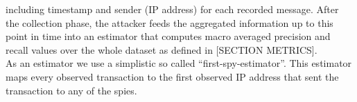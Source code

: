 including timestamp and sender (IP address) for each recorded message. After the collection phase,
the attacker feeds the aggregated information up to this point in time into an estimator that
computes macro averaged precision and recall values over the whole dataset as defined in
[SECTION METRICS]. \\
As an estimator we use a simplistic so called ``first-spy-estimator''.
This estimator maps every observed transaction to the first observed IP address that
sent the transaction to any of the spies. \\






